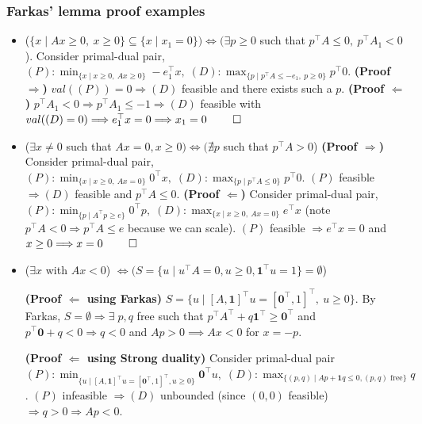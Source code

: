 \documentclass{article}
\begin{document}
\subsubsection{Farkas' lemma proof examples}
\begin{itemize}
    \item ($\{x\mid Ax\geq 0,\ x\geq 0\} \subseteq \{x\mid x_1=0\}) \iff (\exists p\geq 0$ such that $p^\top A \leq 0,\ p^\top A_1 < 0$). 
    \newline Consider primal-dual pair, $(P):\min_{\{x\mid x\geq 0,\ Ax\geq 0\}}-e_1^\top x,\; (D): \max_{\{p\mid p^\top A\leq -e_1,\ p\geq 0\}}p^\top 0$. \textbf{(Proof $\Rightarrow$)} $val((P)) = 0 \Longrightarrow (D)$ feasible and there exists such a $p$. \textbf{(Proof $\Leftarrow$)} $p^\top A_1 < 0 \Rightarrow p^\top A_1 \leq -1 \Rightarrow (D)$ feasible with $val((D) = 0) \Longrightarrow e_1^\top x = 0 \Longrightarrow x_1 = 0\ \qed$

    \item ($\exists x \neq 0$ such that $Ax=0, x\geq 0) \iff (\nexists p$ such that $p^\top A > 0$)
    \newline \textbf{(Proof $\Rightarrow$)} Consider primal-dual pair, $(P):\min_{\{x\mid x\geq 0,\ Ax= 0\}}0^\top x,\; (D): \max_{\{p\mid p^\top A\leq 0\}}p^\top 0$. $(P)$ feasible $\Rightarrow (D)$ feasible and $p^\top A \leq 0$. \textbf{(Proof $\Leftarrow$)} Consider primal-dual pair, $(P):\min_{\{p\mid A^\top p \geq e\}}0^\top p,\; (D): \max_{\{x \mid x\geq 0,\ Ax = 0\}}e^\top x$ (note $p^\top A < 0 \Rightarrow p^\top A \leq e$ because we can scale). $(P)$ feasible $\Longrightarrow e^\top x = 0$ and $x\geq 0 \Longrightarrow x = 0\ \qed$ 

    \item ($\exists x$ with $Ax < 0$) $\iff (S = \{u \mid u^\top A = 0, u \geq 0, \mathbf{1}^\top u = 1\} = \emptyset$)
    
    \textbf{(Proof $\Leftarrow$ using Farkas)} $S = \{u \mid [A, \mathbf{1}]^\top u = [\mathbf{0}^\top , 1]^\top ,\ u \geq 0\}$. By Farkas, $S=\emptyset\Longrightarrow \exists\;p, q$ free such that $p^\top A^\top  + q\mathbf{1}^\top  \geq \mathbf{0}^\top $ and $p^\top \mathbf{0} + q < 0 \Longrightarrow q < 0$ and $Ap > 0 \implies Ax < 0$ for $x = -p$.

    \textbf{(Proof $\Leftarrow$ using Strong duality)} Consider primal-dual pair $(P): \min_{\{u\mid  [A, \mathbf{1}]^\top u = [\mathbf{0}^\top , 1]^\top , u \geq 0\}}\mathbf{0}^\top u,\; (D): \max_{\{(p,q)\mid Ap + \mathbf{1}q \leq 0, (p,q) \text{ free}\}} q$. $(P)$ infeasible $\Longrightarrow (D)$ unbounded (since $(0,0)$ feasible) $\Longrightarrow q > 0 \Longrightarrow Ap < 0$.


\end{itemize}
\end{document}
